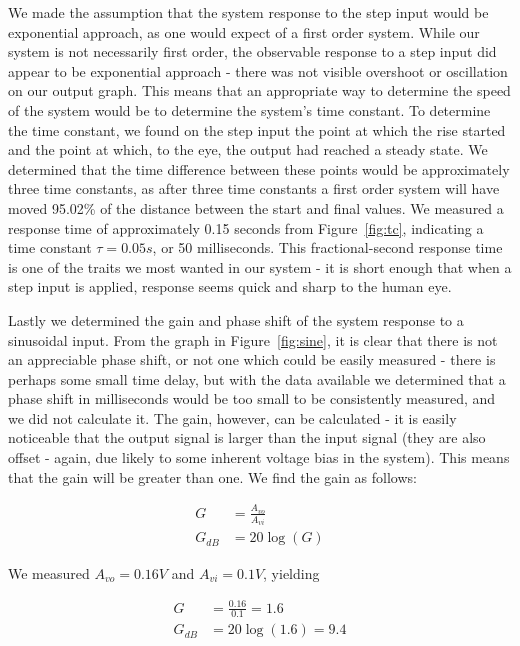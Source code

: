 \documentclass{article}
\begin{document}
We made the assumption that the system response to the step input would be exponential approach, as one would expect of a first order system.  While our system is not necessarily first order, the observable response to a step input did appear to be exponential approach - there was not visible overshoot or oscillation on our output graph.  This means that an appropriate way to determine the speed of the system would be to determine the system's time constant.  To determine the time constant, we found on the step input the point at which the rise started and the point at which, to the eye, the output had reached a steady state.  We determined that the time difference between these points would be approximately three time constants, as after three time constants a first order system will have moved 95.02\% of the distance between the start and final values.  We measured a response time of approximately 0.15 seconds from Figure~\ref{fig:tc}, indicating a time constant $\tau = 0.05 s$, or 50 milliseconds.  This fractional-second response time is one of the traits we most wanted in our system - it is short enough that when a step input is applied, response seems quick and sharp to the human eye.

Lastly we determined the gain and phase shift of the system response to a sinusoidal input.  From the graph in Figure~\ref{fig:sine}, it is clear that there is not an appreciable phase shift, or not one which could be easily measured - there is perhaps some small time delay, but with the data available we determined that a phase shift in milliseconds would be too small to be consistently measured, and we did not calculate it.  The gain, however, can be calculated - it is easily noticeable that the output signal is larger than the input signal (they are also offset - again, due likely to some inherent voltage bias in the system).  This means that the gain will be greater than one.  We find the gain as follows:
\begin{center}
\begin{align*}
G &= \frac{A_{vo}}{A_{vi}} \\
G_{dB} &= 20\log(G)
\end{align*}
\end{center}

We measured $A_{vo} = 0.16 V$ and $A_{vi} = 0.1 V$, yielding
\begin{center}
\begin{align*}
G &= \frac{0.16}{0.1} = 1.6 \\
G_{dB} &= 20\log(1.6) = 9.4
\end{align*}
\end{center}
\end{document}
